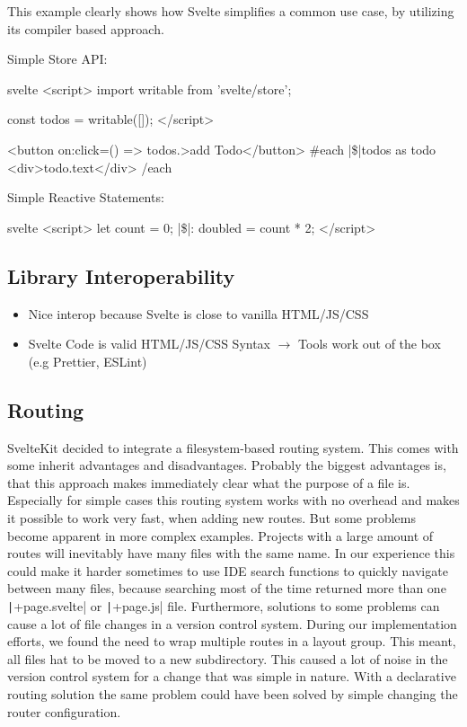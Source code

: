 This example clearly shows how Svelte simplifies a common use case, by utilizing its compiler based approach.

Simple Store API:
\begin{myminted}[escapeinside=||]{svelte}{}
<script>
    import { writable } from 'svelte/store';

    const todos = writable([]);
</script>

<button on:click={() => todos.}>add Todo</button>
{#each |\$|todos as todo}
    <div>{todo.text}</div>
{/each}
\end{myminted}

Simple Reactive Statements:
\begin{myminted}[escapeinside=||]{svelte}{}
<script>
    let count = 0;
    |\$|: doubled = count * 2;
</script>
\end{myminted}

\subsection{Library Interoperability}

\begin{itemize}
    \item Nice interop because Svelte is close to vanilla HTML/JS/CSS
    \item Svelte Code is valid HTML/JS/CSS Syntax $\rightarrow$ Tools work out of the box (e.g Prettier, ESLint)
\end{itemize}


\subsection{Routing}
SvelteKit decided to integrate a filesystem-based routing system. This comes with some inherit advantages and disadvantages. Probably the biggest advantages is, that this approach makes immediately clear what the purpose of a file is. Especially for simple cases this routing system works with no overhead and makes it possible to work very fast, when adding new routes. But some problems become apparent in more complex examples. Projects with a large amount of routes will inevitably have many files with the same name. In our experience this could make it harder sometimes to use IDE search functions to quickly navigate between many files, because searching most of the time returned more than one \texttt|+page.svelte| or \texttt|+page.js| file. Furthermore, solutions to some problems can cause a lot of file changes in a version control system. During our implementation efforts, we found the need to wrap multiple routes in a layout group. This meant, all files hat to be moved to a new subdirectory. This caused a lot of noise in the version control system for a change that was simple in nature. With a declarative routing solution the same problem could have been solved by simple changing the router configuration.

